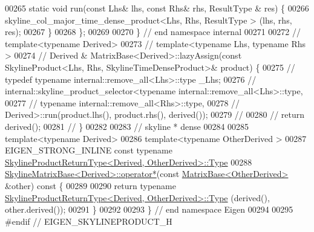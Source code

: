 \begin{DoxyCode}
00265     \textcolor{keyword}{static} \textcolor{keywordtype}{void} run(\textcolor{keyword}{const} Lhs& lhs, \textcolor{keyword}{const} Rhs& rhs, ResultType & res) \{
00266         skyline\_col\_major\_time\_dense\_product<Lhs, Rhs, ResultType > (lhs, rhs, res);
00267     \}
00268 \};
00269 
00270 \} \textcolor{comment}{// end namespace internal}
00271 
00272 \textcolor{comment}{// template<typename Derived>}
00273 \textcolor{comment}{// template<typename Lhs, typename Rhs >}
00274 \textcolor{comment}{// Derived & MatrixBase<Derived>::lazyAssign(const SkylineProduct<Lhs, Rhs, SkylineTimeDenseProduct>&
       product) \{}
00275 \textcolor{comment}{//     typedef typename internal::remove\_all<Lhs>::type \_Lhs;}
00276 \textcolor{comment}{//     internal::skyline\_product\_selector<typename internal::remove\_all<Lhs>::type,}
00277 \textcolor{comment}{//             typename internal::remove\_all<Rhs>::type,}
00278 \textcolor{comment}{//             Derived>::run(product.lhs(), product.rhs(), derived());}
00279 \textcolor{comment}{// }
00280 \textcolor{comment}{//     return derived();}
00281 \textcolor{comment}{// \}}
00282 
00283 \textcolor{comment}{// skyline * dense}
00284 
00285 \textcolor{keyword}{template}<\textcolor{keyword}{typename} Derived>
00286 \textcolor{keyword}{template}<\textcolor{keyword}{typename} OtherDerived >
00287 EIGEN\_STRONG\_INLINE \textcolor{keyword}{const} \textcolor{keyword}{typename} 
      \hyperlink{class_eigen_1_1_skyline_product}{SkylineProductReturnType<Derived, OtherDerived>::Type}
00288 \hyperlink{class_eigen_1_1_skyline_matrix_base}{SkylineMatrixBase<Derived>::operator*}(\textcolor{keyword}{const} 
      \hyperlink{group___core___module_class_eigen_1_1_matrix_base}{MatrixBase<OtherDerived>} &other)\textcolor{keyword}{ const }\{
00289 
00290     \textcolor{keywordflow}{return} \textcolor{keyword}{typename} \hyperlink{class_eigen_1_1_skyline_product}{SkylineProductReturnType<Derived, OtherDerived>::Type}
      (derived(), other.derived());
00291 \}
00292 
00293 \} \textcolor{comment}{// end namespace Eigen}
00294 
00295 \textcolor{preprocessor}{#endif // EIGEN\_SKYLINEPRODUCT\_H}
\end{DoxyCode}
